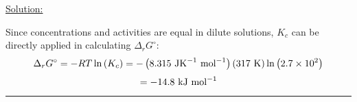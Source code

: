 \noindent
\underline{Solution:}

Since concentrations and activities are equal in dilute solutions, $K_c$ can be directly applied in calculating $\Delta_rG^\circ$:
$$\Delta_rG^\circ = -RT\ln\left(K_c\right) = -\left(8.315\textnormal{ JK}^{-1}\textnormal{ mol}^{-1}\right)\left(317\textnormal{ K}\right)\ln\left(2.7\times 10^2\right)$$
$$ = -14.8\textnormal{ kJ mol}^{-1}$$

\hrule\vspace{0.5cm}
